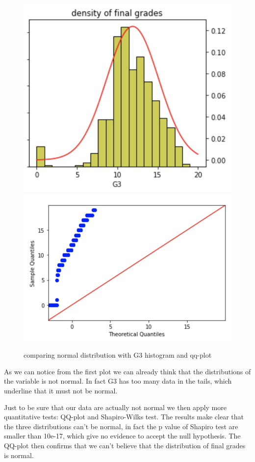 \documentclass[a4paper, 11pt]{report}
\theoremstyle{definition}
\numberwithin{equation}{section}		%
\numberwithin{figure}{section}			%
\numberwithin{table}{section}				%
\begin{document}
\begin{figure}[h]
\includegraphics[scale=0.5]{G3_distribution.png}
\includegraphics[scale=0.5]{qq-plot_G3.png}
\caption{comparing normal distribution with G3 histogram and qq-plot}
\end{figure}

As we can notice from the first plot we can already think that the distributions of the variable is not normal. In fact G3 has too many data in the tails, which underline that it must not be normal.

Just to be sure that our data are actually not normal we then apply more quantitative tests: QQ-plot and Shapiro-Wilks test.
The results make clear that the three distributions can't be normal, in fact the p value of Shapiro test are smaller than 10e-17, which give no evidence to accept the null hypothesis. The QQ-plot then confirms that we can't believe that the distribution of final grades is normal.
\end{document}

